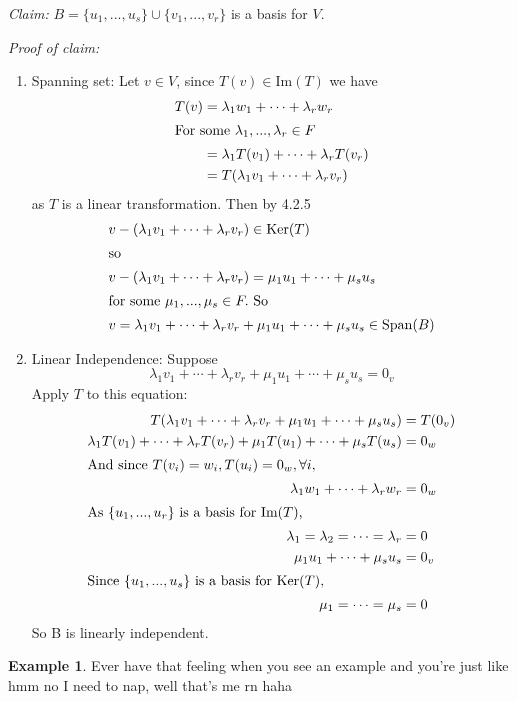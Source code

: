 \documentclass{report}
\theoremstyle{remark}
\theoremstyle{definition}
\theoremstyle{definition}
\newtheorem{example}[theorem]{Example}
\theoremstyle{theorem}
\begin{document}
\emph{Claim:} $B = \{u_1, ..., u_s\} \cup \{v_1,...,v_r\}$ is a basis for $V$.\par
\emph{Proof of claim:}
\begin{enumerate}
    \item Spanning set: Let $v \in V$, since $T(v) \in \mathrm{Im}(T)$ we have
    \begin{align*}
        T(v) &= \lambda_1w_1 + \cdots + \lambda_rw_r\\
        \intertext{For some $\lambda_1,...,\lambda_r \in F$}
        &= \lambda_1T(v_1) + \cdots + \lambda_rT(v_r)\\
        &= T(\lambda_1v_1 + \cdots + \lambda_rv_r)
    \end{align*}
    as $T$ is a linear transformation. Then by 4.2.5
    \begin{align*}
        v&-(\lambda_1v_1 + \cdots + \lambda_rv_r) \in \mathrm{Ker}(T)\\
        \intertext{so}
        v&-(\lambda_1v_1 + \cdots + \lambda_rv_r) =\mu_1u_1+\cdots+\mu_su_s\\
        \intertext{for some $\mu_1,...,\mu_s \in F.$ So}
        v&= \lambda_1v_1 + \cdots + \lambda_rv_r + \mu_1u_1 + \cdots + \mu_su_s \in \mathrm{Span}(B)
    \end{align*}
    \item Linear Independence: Suppose
    \[\lambda_1v_1 + \cdots + \lambda_rv_r + \mu_1u_1 + \cdots + \mu_su_s = 0_v\]
    Apply $T$ to this equation:
    \begin{align*}
        T(\lambda_1v_1 + \cdots + \lambda_rv_r + \mu_1u_1 + \cdots + \mu_su_s)&= T(0_v)\\
        \lambda_1T(v_1) + \cdots + \lambda_rT(v_r) + \mu_1T(u_1) + \cdots + \mu_sT(u_s) &=0_w\\
        \intertext{And since $T(v_i) = w_i, T(u_i) = 0_w, \forall i,$}
        \lambda_1w_1 + \cdots + \lambda_rw_r &=0_w\\
        \intertext{As $\{u_1,...,u_r\}$ is a basis for Im$(T)$,}
        \lambda_1=\lambda_2=\cdots=\lambda_r&=0\\
        \mu_1u_1 + \cdots + \mu_su_s &=0_v\\
        \intertext{Since $\{u_1,...,u_s\}$ is a basis for Ker$(T)$,}
        \mu_1 = \cdots = \mu_s &= 0
    \end{align*}
    So B is linearly independent.
\end{enumerate}
\begin{example}
Ever have that feeling when you see an example and you're just like hmm no I need to nap, well that's me rn haha
\end{example}
\end{document}
